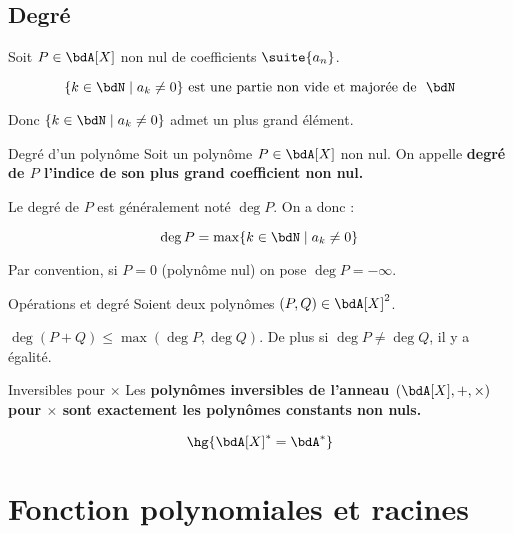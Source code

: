 \documentclass[a4paper,french,bookmarks]{article}
\begin{document}

\subsection{Degré}

Soit $P \in \bdA[X]$ non nul de coefficients $\suite{a_n}$.

\[ \{ k \in \bdN \mid a_k \neq 0 \} \ \text{est une partie non vide et majorée de } \ \bdN\]

Donc $\{ k \in \bdN \mid a_k \neq 0 \}$ admet un plus grand élément.

\begin{definition}{Degré d'un polynôme}{}
    Soit un polynôme $P \in \bdA[X]$ non nul. On appelle \bf{degré de $P$} l'indice de son plus grand coefficient non nul.
\end{definition}

Le degré de $P$ est généralement noté $\deg P$. On a donc :

\[ \deg P = \max \{ k \in \bdN \mid a_k \neq 0 \} \]

Par convention, si $P = 0$ (polynôme nul) on pose $\deg P = -\infty$.

\begin{theorem}{Opérations et degré}
    Soient deux polynômes $(P, Q) \in \bdA[X]^2$.
    
    \begin{enumerate}
        \ithand $\deg (P+Q) \leq \max(\deg P, \deg Q)$. De plus si $\deg P \neq \deg Q$, il y a égalité.
    \end{enumerate}
\end{theorem}

\demoth{

}

\begin{property}{Inversibles pour $\times$}{}
    Les \bf{polynômes inversibles} de l'anneau $(\bdA[X], +, \times)$ pour $\times$ sont exactement les polynômes constants non nuls. 
    
    \[ \hg{\bdA[X]^* = \bdA^*}\]
\end{property}


\section{Fonction polynomiales et racines}
\end{document}
